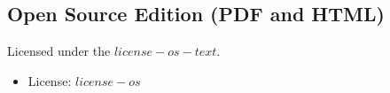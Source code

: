 \subsection*{Open Source Edition (PDF and HTML)}
Licensed under the $license-os-text$.

\begin{itemize}
  \item License: \href{$license-os-url$}{$license-os$}
\end{itemize}


\vspace*{\fill}

\newpage
\thispagestyle{empty}









\clearpage
{}





